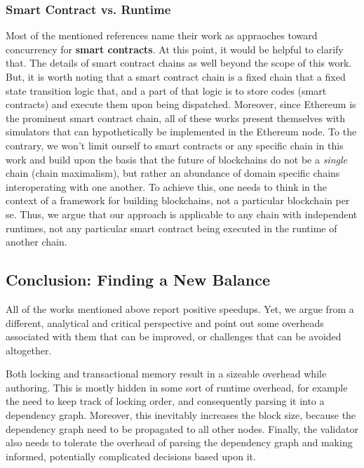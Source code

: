 
\subsubsection{Smart Contract vs. Runtime}


Most of the mentioned references name their work as appraoches toward concurrency for \textbf{smart
contracts}. At this point, it would be helpful to clarify that. The details of smart contract chains
as well beyond the scope of this work. But, it is worth noting that a smart contract chain is a
fixed chain that a fixed state transition logic that, and a part of that logic is to store codes
(smart contracts) and execute them upon being dispatched. Moreover, since Ethereum is the prominent
smart contract chain, all of these works present themselves with simulators that can hypothetically
be implemented in the Ethereum node. To the contrary, we won't limit ourself to smart contracts or
any specific chain in this work and build upon the basis that the future of blockchains do not be
a \textit{single} chain (chain maximalism), but rather an abundance of domain specific chains
interoperating with one another. To achieve this, one needs to think in the context of a framework
for building blockchains, not a particular blockchain per se. Thus, we argue that our approach is
applicable to any chain with independent runtimes, not any particular smart contract being executed
in the runtime of another chain.

\subsection{Conclusion: Finding a New Balance}


All of the works mentioned above report positive speedups. Yet, we argue from a different,
analytical and critical perspective and point out some overheads associated with them that can be
improved, or challenges that can be avoided altogether.

Both locking and transactional memory result in a sizeable overhead while authoring. This is
mostly hidden in some sort of runtime overhead, for example the need to keep track of locking order,
and consequently parsing it into a dependency graph. Moreover, this inevitably increases the
block size, because the dependency graph need to be propagated to all other nodes. Finally, the
validator also needs to tolerate the overhead of parsing the dependency graph and making informed,
potentially complicated decisions based upon it.

